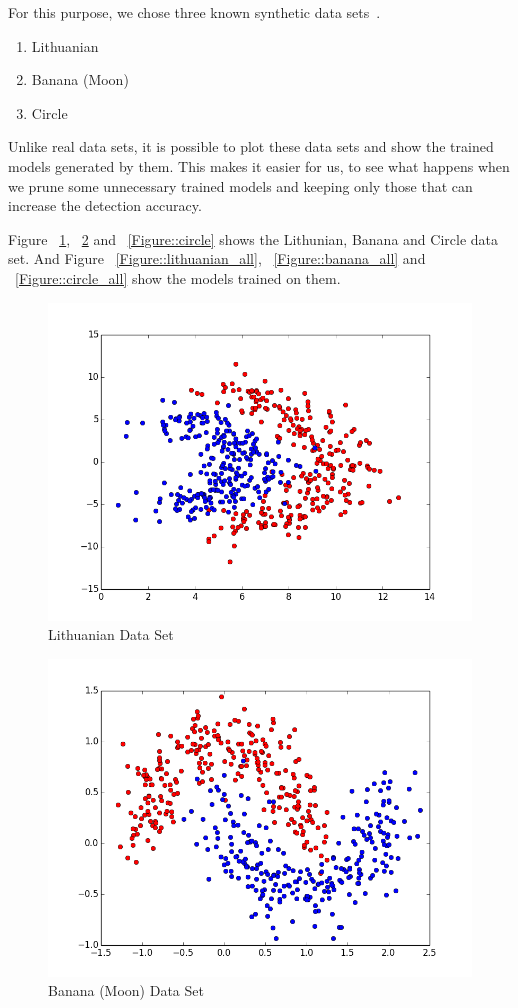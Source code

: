 For this purpose, we chose three known synthetic data sets~\cite{Duin2000}. 
\begin{enumerate}
  \item Lithuanian
  \item Banana (Moon)
  \item Circle
\end{enumerate}  
Unlike real data sets, it is possible to plot these data sets and show the trained models generated by them. This makes it easier for us, to see what happens when we prune some unnecessary trained models and keeping only those that can increase the detection accuracy.

Figure ~\ref{Figure::lithuanian}, ~\ref{Figure::banana} and ~\ref{Figure::circle} shows the Lithunian, Banana and Circle data set. And Figure ~\ref{Figure::lithuanian_all}, ~\ref{Figure::banana_all} and ~\ref{Figure::circle_all} show the models trained on them.

\begin{figure}[]
\centering
\includegraphics[scale=0.6]{figs/dataset_Lithuanian}
\caption{Lithuanian Data Set}
\label{Figure::lithuanian}
\end{figure}

\begin{figure}[]
\centering
\includegraphics[scale=0.6]{figs/dataset_Banana}
\caption{Banana (Moon) Data Set}
\label{Figure::banana}
\end{figure}

